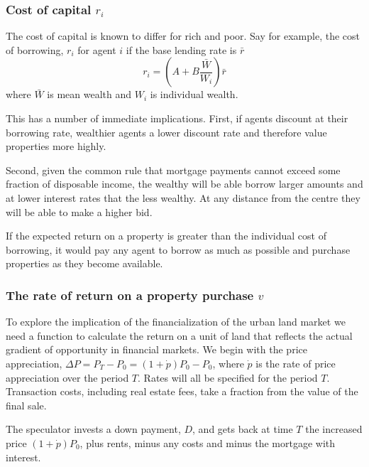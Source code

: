 \subsubsection{Cost of capital $r_i$}
The cost of capital is known to differ for rich and poor. Say for example, the cost of borrowing, $r_i$ for agent $i$ if the base lending rate is $\bar{r}$
 \[ r_i = (A + B \frac{\bar{W}}{W_i})\bar r\]
where $\bar{W}$ is mean wealth and $W_i$ is individual wealth. %

% 

This has a number of immediate implications. First, if agents discount at their borrowing rate, wealthier agents a lower discount rate and therefore value properties more highly. 

Second, given the  common rule that mortgage payments cannot exceed some fraction of disposable income, the wealthy will be able borrow larger amounts and at lower interest rates that the less wealthy. At any distance from the centre they will be able to make a higher bid.
 
If the expected return on a property is greater than the individual cost of borrowing, it would pay any agent to borrow as much as possible and purchase properties as they become available.

\subsubsection{The rate of return on a property purchase $v$}
To explore the implication of the financialization of the urban land market we need a function to calculate the return on a unit of land that reflects the actual gradient of opportunity in financial markets. We begin with the price appreciation, $\Delta P=P_T-P_0 = (1+\dot p)P_0-P_0 $, where $\dot p$ is the rate of price appreciation over the period $T$. Rates will all be specified for the period $T$. Transaction costs, including real estate fees, take a fraction from the value of the final sale.

 The speculator invests a down payment, $D$, and gets back at time $T$ the  increased price $(1+\dot p)P_0$, plus rents, minus any costs and minus the mortgage with interest.
 
